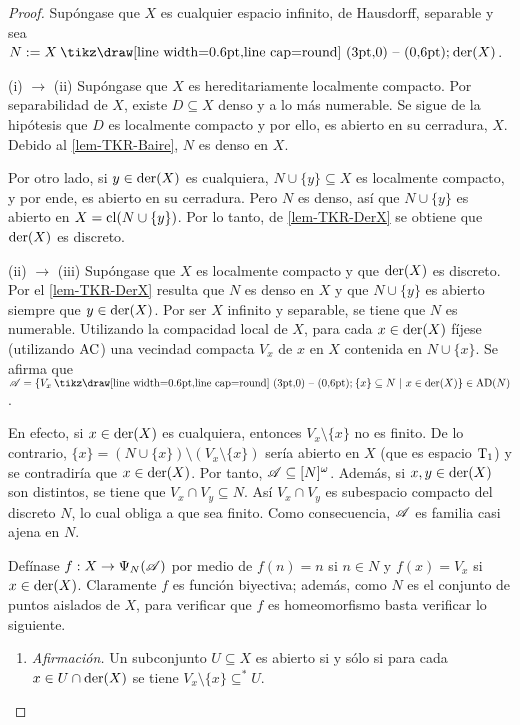 \begin{proof}
	Supóngase que $X$ es cualquier espacio infinito, de Hausdorff, separable y sea $N:=X \setminus \der(X)$.

	(i) $\rightarrow$ (ii) Supóngase que $X$ es hereditariamente localmente compacto. Por separabilidad de $X$, existe $D \subseteq X$ denso y a lo más numerable. Se sigue de la hipótesis que $D$ es localmente compacto y por ello, es abierto en su cerradura, $X$. Debido al \autoref{lem-TKR-Baire}, $N$ es denso en $X$.

	Por otro lado, si $y \in \operatorname{der}(X)$ es cualquiera, $N \cup \{y\} \subseteq X$ es localmente compacto, y por ende, es abierto en su cerradura. Pero $N$ es denso, así que $N \cup \{y\}$ es abierto en $X=\operatorname{cl}(N \cup \{y\})$. Por lo tanto, de \ref{lem-TKR-DerX} se obtiene que $\operatorname{der}(X)$ es discreto.

	(ii) $\rightarrow$ (iii) Supóngase que $X$ es localmente compacto y que $\operatorname{der}(X)$ es discreto. Por el \autoref{lem-TKR-DerX} resulta que $N$ es denso en $X$ y que $N \cup \{y\}$ es abierto siempre que $y \in \operatorname{der}(X)$. Por ser $X$ infinito y separable, se tiene que $N$ es numerable. Utilizando la compacidad local de $X$, para cada $x \in \operatorname{der}(X)$ fíjese (utilizando $\operatorname{AC}$) una vecindad compacta $V_x$ de $x$ en $X$ contenida en $N \cup \{x\}$. Se afirma que $ \ms{A} = \{ V_x \setminus \{x\} \subseteq N \tq x \in \der(X) \} \in \Ad(N) $.

	En efecto, si $x \in \operatorname{der}(X)$ es cualquiera, entonces $V_x \setminus \{x\}$ no es finito. De lo contrario, $\{x\}= (N \cup \{x\}) \setminus (V_x \setminus \{x\})$ sería abierto en $X$ (que es espacio $\operatorname{T}_1$) y se contradiría que $x \in \operatorname{der}(X)$. Por tanto, $\mathscr{A} \subseteq [N]^\omega$. Además, si $x,y \in \operatorname{der}(X)$ son distintos, se tiene que $V_x \cap V_y \subseteq N$. Así $V_x \cap V_y$ es subespacio compacto del discreto $N$, lo cual obliga a que sea finito. Como consecuencia, $\mathscr{A}$ es familia casi ajena en $N$.

	Defínase $f:X \to \Psi_N(\mathscr{A})$ por medio de $f(n)=n$ si $n \in N$ y $f(x)=V_x$ si $x \in \operatorname{der}(X)$. Claramente $f$ es función biyectiva; además, como $N$ es el conjunto de puntos aislados de $X$, para verificar que $f$ es homeomorfismo basta verificar lo siguiente.
	\begin{enumerate}[\hspace{1.5 cm}, listparindent=1.5em]
		\item \textit{Afirmación.} Un subconjunto $U \subseteq X$ es abierto si y sólo si para cada $x \in U \cap \operatorname{der}(X)$ se tiene $V_x \setminus \{x\} \subseteq^* U$.


\end{enumerate}
\end{proof}
